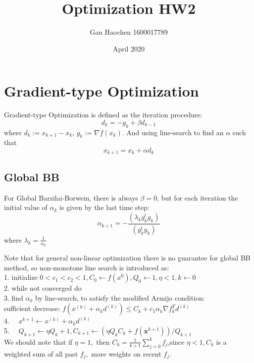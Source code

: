 \documentclass{article}
\title{Optimization HW2}
\author{Gan Haochen 1600017789 }
\date{April 2020}
\begin{document}
\maketitle

\section{Gradient-type Optimization}

Gradient-type Optimization is defined as the iteration procedure:
\begin{equation}
d_{k} = -g_k + \beta d_{k-1}
\end{equation}
where $d_k:=x_{k+1} - x_{k}$, $g_k:= \nabla f(x_k)$.
And using line-search to find an $\alpha$ such that 
\begin{equation}
x_{k+1} = x_{k} + \alpha  d_{k}
\end{equation}

\subsection{Global BB}
For Global Barzilai-Borwein, there is always $\beta=0$, but for each iteration the initial value of $\alpha_k$ is given by the last time step:
\begin{equation}\alpha_{k+1}=-\frac{ \left(\lambda_{k} g_{k}^{t} g_{k}\right)}{\left(g_{k}^{t} y_{k}\right)}
\end{equation}
where $\lambda_k = \frac{1}{\alpha_{k}}$

Note that for general non-linear optimization there is no guarantee for global BB method, so non-monotone line search is introduced as:\\
1. initialize $0<c_{1}<c_{2}<1, C_{0} \leftarrow f\left(x^{0}\right), Q_{0} \leftarrow 1, \eta<1, k \leftarrow 0$ \\
2. while not converged do \\
3. find $\alpha_{k}$ by line-search, to satisfy the modified Armijo condition: \\
sufficient decrease: $f\left(x^{(k)}+\alpha_{k} d^{(k)}\right) \leq C_{k}+c_{1} \alpha_{k} \nabla f_{k}^{T} d^{(k)}$ \\
4. $\quad x^{k+1} \leftarrow x^{(k)}+\alpha_{k} d^{(k)}$ \\
5. $\quad Q_{k+1} \leftarrow \eta Q_{k}+1, C_{k+1} \leftarrow\left(\eta Q_{k} C_{k}+f\left(\boldsymbol{x}^{k+1}\right)\right) / Q_{k+1}$ \\

We should note that if $\eta=1,$ then $C_{k}=\frac{1}{k+1} \sum_{j=0}^{k} f_{j}$,since $\eta<1, C_{k}$ is a weighted sum of all past $f_{j},$ more weights on recent $f_{j}$.
\end{document}
